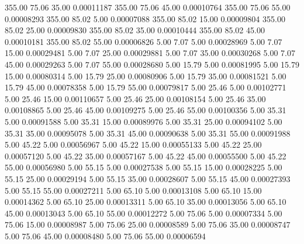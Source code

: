     355.00     75.06     35.00     0.00011187
    355.00     75.06     45.00     0.00010764
    355.00     75.06     55.00     0.00008293
    355.00     85.02      5.00     0.00007088
    355.00     85.02     15.00     0.00009804
    355.00     85.02     25.00     0.00009830
    355.00     85.02     35.00     0.00010444
    355.00     85.02     45.00     0.00010181
    355.00     85.02     55.00     0.00006826
      5.00      7.07      5.00     0.00028969
      5.00      7.07     15.00     0.00029481
      5.00      7.07     25.00     0.00029881
      5.00      7.07     35.00     0.00030268
      5.00      7.07     45.00     0.00029263
      5.00      7.07     55.00     0.00028680
      5.00     15.79      5.00     0.00081995
      5.00     15.79     15.00     0.00080314
      5.00     15.79     25.00     0.00080906
      5.00     15.79     35.00     0.00081521
      5.00     15.79     45.00     0.00078358
      5.00     15.79     55.00     0.00079817
      5.00     25.46      5.00     0.00102771
      5.00     25.46     15.00     0.00110657
      5.00     25.46     25.00     0.00108154
      5.00     25.46     35.00     0.00108865
      5.00     25.46     45.00     0.00109275
      5.00     25.46     55.00     0.00100356
      5.00     35.31      5.00     0.00091588
      5.00     35.31     15.00     0.00089976
      5.00     35.31     25.00     0.00094102
      5.00     35.31     35.00     0.00095078
      5.00     35.31     45.00     0.00090638
      5.00     35.31     55.00     0.00091988
      5.00     45.22      5.00     0.00056967
      5.00     45.22     15.00     0.00055133
      5.00     45.22     25.00     0.00057120
      5.00     45.22     35.00     0.00057167
      5.00     45.22     45.00     0.00055500
      5.00     45.22     55.00     0.00056980
      5.00     55.15      5.00     0.00027538
      5.00     55.15     15.00     0.00028225
      5.00     55.15     25.00     0.00029194
      5.00     55.15     35.00     0.00028607
      5.00     55.15     45.00     0.00027393
      5.00     55.15     55.00     0.00027211
      5.00     65.10      5.00     0.00013108
      5.00     65.10     15.00     0.00014362
      5.00     65.10     25.00     0.00013311
      5.00     65.10     35.00     0.00013056
      5.00     65.10     45.00     0.00013043
      5.00     65.10     55.00     0.00012272
      5.00     75.06      5.00     0.00007334
      5.00     75.06     15.00     0.00008987
      5.00     75.06     25.00     0.00008589
      5.00     75.06     35.00     0.00008747
      5.00     75.06     45.00     0.00008480
      5.00     75.06     55.00     0.00006594
